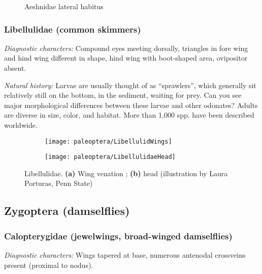 \begin{figure}[ht!]
  \centering
  \caption{Aeshnidae lateral habitus \citep[][Plate 28, Fig. 5]{aeshnaNorthAmerica}}
  \label{fig:aeshnidHabitus}
\end{figure}

\subsubsection{Libellulidae (common skimmers)} 
\noindent{}\textit{Diagnostic characters:} Compound eyes meeting dorsally, triangles in fore wing and hind wing different in shape, hind wing with boot-shaped area, ovipositor absent.\vspace{3mm}

\noindent{}\textit{Natural history:} Larvae are usually thought of as ``sprawlers'', which generally sit relatively still on the bottom, in the sediment, waiting for prey. Can you see major morphological differences between these larvae and other odonates? Adults are diverse in size, color, and habitat. More than 1,000 spp. have been described worldwide.\vspace{3mm}

\begin{figure}[ht!]
    \centering
    \begin{subfigure}[ht!]{0.5\textwidth}
        \texttt{[image: paleoptera/LibellulidWings]}
        \caption{}
        \label{fig:libelwing}
    \end{subfigure}
    \hfill
    \begin{subfigure}[ht!]{0.25\textwidth}
        \texttt{[image: paleoptera/LibellulidaeHead]}
        \caption{}
        \label{fig:libelbody}
    \end{subfigure}
    \caption{Libellulidae. \textbf{(a)} Wing venation \citep[][Fig. 240]{comstock1918wings}; \textbf{(b)} head (illustration by Laura Porturas, Penn State)}\label{fig:libell}
\end{figure}

\subsection{Zygoptera (damselflies)}
\subsubsection{Calopterygidae (jewelwings, broad-winged damselflies)}
\noindent{}\textit{Diagnostic characters:} Wings tapered at base, numerous antenodal crossveins present (proximal to nodus).\vspace{3mm}

